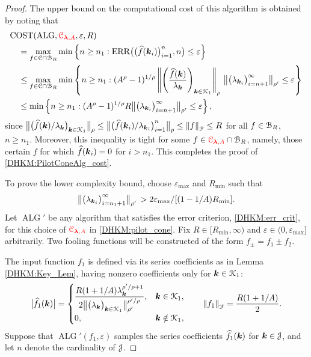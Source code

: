 \documentclass[USenglish]{article}
\theoremstyle{dgthm}
\theoremstyle{dgthm}
\theoremstyle{dgthm}
\theoremstyle{dgthm}
\theoremstyle{dgdef}
\theoremstyle{definition}
\DeclareMathOperator{\ALG}{ALG}
\DeclareMathOperator{\ERR}{ERR}
\newcommand{\dataN}{\bigl(\hf(\bsk_i)\bigr)_{i=1}^n}
\newcommand{\ERRN}{\ERR\bigl(\dataN,n\bigr)}
\DeclareMathOperator{\COST}{COST}
\newcommand{\hf}{\widehat{f}}
\newcommand{\bigabs}[1]{\ensuremath{\bigl \lvert #1 \bigr \rvert}}
\newcommand{\norm}[2][{}]{\ensuremath{\left \lVert #2 \right \rVert}_{#1}}
\newcommand{\bignorm}[2][{}]{\ensuremath{\bigl \lVert #2 \bigr \rVert}_{#1}}
\newcommand{\DHKMchange}[1]{{\color{red}{#1}}}
\begin{document}
\begin{proof} 
The upper bound on the computational cost of this algorithm is obtained by noting that 
\begin{align*}
    \MoveEqLeft[1]{\COST(\ALG,\DHKMchange{\calC_{\boldsymbol{\lambda},A}},\varepsilon,R)} \\
    & = \max_{f \in \calC \cap \calB_{R}} \min \left \{n \ge n_1 : \ERRN \le \varepsilon \right \} \\
     & \le \max_{f \in \calC \cap \calB_{R}} \min \left \{n \ge n_1 : 
     (A^\rho -1)^{1/\rho} \norm[\rho]{\left( \frac{\hf(\bsk)}{\lambda_{\bsk}} \right)_{\bsk \in \calK_1 }} \, 
     \bignorm[\rho']{\bigl(  \lambda_{\bsk_i}  \bigr)_{i = n+1}^{\infty}}
    \le \varepsilon \right \} \\   
     & \le \min \left \{n \ge n_1 : 
     (A^\rho -1)^{1/\rho} R \bignorm[\rho']{\bigl(  \lambda_{\bsk_i}  \bigr)_{i = n+1}^{\infty}} 
    \le \varepsilon \right \},  
\end{align*}
since $\bignorm[\rho]{\bigl( \hf(\bsk)/\lambda_{\bsk} \bigr)_{\bsk \in \calK_1}} \le \bignorm[\rho]{\bigl( \hf(\bsk_i)/\lambda_{\bsk_i} \bigr)_{i=1}^{n}} \le  \norm[\calF]{f} \le R$ for all $f \in {\mathcal{B}}_R$, $n \ge n_1$.  Moreover, this inequality is tight for some $f \in \DHKMchange{\calC_{\boldsymbol{\lambda},A}} \cap \calB_{R}$, namely, those certain $f$ for which $\hf(\bsk_i) = 0$ for $i > n_1$.  This completes the proof of \eqref{DHKM:PilotConeAlg_cost}.

To prove the lower complexity bound, choose $\varepsilon_{\max}$ and $R_{\min}$ such that 
\[
\bignorm[\rho']{\bigl(  \lambda_{\bsk_i}  \bigr)_{i = n_1+1}^{\infty}} \,
    > 2\varepsilon_{\max}/[(1 - 1/A) R_{\min}].
    \]
Let $\ALG'$ be any algorithm that satisfies the error criterion, \eqref{DHKM:err_crit}, for this choice of $\DHKMchange{\calC_{\boldsymbol{\lambda},A}}$ in \eqref{DHKM:pilot_cone}.   Fix $R \in [R_{\min},\infty)$ and $\varepsilon \in (0,\varepsilon_{\max}]$ arbitrarily.  Two fooling functions will be constructed of the form $f_\pm = f_1 \pm f_2$.  

The input function $f_1$ is defined via its series coefficients as in Lemma \ref{DHKM:Key_Lem}, having nonzero coefficients only for ${\boldsymbol{k}} \in {\mathcal{K}}_1$:
\begin{equation*}
    \bigabs{\hf_1(\bsk)} = \begin{cases} \displaystyle \frac{R (1+1/A) \lambda_{\bsk}^{\rho'/\rho + 1}}{2\bignorm[\rho']{\bigl(  \lambda_{\bsk}  \bigr)_{\bsk \in \calK_1}}^{\rho'/\rho}}, &  \bsk \in \calK_1, \\
    0, & \bsk \notin \calK_1,
    \end{cases}
   \qquad \norm[\calF]{f_1} = \frac{R(1 + 1/A)}{2}.
\end{equation*}
Suppose that $\ALG'(f_1,\varepsilon)$ samples the series coefficients $\hf_1(\bsk)$ for ${\boldsymbol{k}} \in {\mathcal{J}}$, and let $n$ denote the cardinality of ${\mathcal{J}}$.  


\end{proof}
\end{document}
